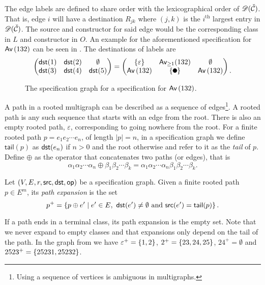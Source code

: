 The edge labels are defined to share order with the lexicographical order of $\mathscr{D}(\check{\mathcal{C}})$. That is, edge $i$ will have a destination $R_{jk}$  where $(j,k)$ is the $i^\text{th}$ largest entry in $\mathscr{D}(\check{\mathcal{C}})$. The source and constructor for said edge would be the corresponding class in $L$ and constructor in $O$. An example for the aforementioned specification for $\textsf{Av}\left(132\right)$ can be seen in . The destinations of labels are
\[
    \begin{pmatrix}
        \dst(1) & \dst(2) & \emptyset\\
        \dst(3) & \dst(4) & \dst(5)
    \end{pmatrix}
    =
    \begin{pmatrix}
    \set{\varepsilon} & \textsf{Av}_{\geq1}(132) & \emptyset \\
    \Av{132} & \set{\point{0.1}} & \Av{132}
    \end{pmatrix}
    \begin{matrix}\\.\end{matrix}
\]

\begin{figure}[ht!]
    \centering
    
    \caption{The specification graph for a specification for $\textsf{Av}\left(132\right)$.}
    \label{fig:specgraph132}
\end{figure}

A path in a rooted multigraph can be described as a sequence of edges\footnote{Using a sequence of vertices is ambiguous in multigraphs.}. A rooted path is any such sequence that starts with an edge from the root. There is also an empty rooted path, $\varepsilon$, corresponding to going nowhere from the root. For a finite rooted path $p=e_1e_2\dotsm e_n$, of length $|p|=n$, in a specification graph we define $\textsf{tail}(p)$ as $\textsf{dst}(e_n)$ if $n>0$ and the root otherwise and refer to it as the \emph{tail} of $p$. Define $\oplus$ as the operator that concatenates two paths (or edges), that is
\[
    \alpha_1\alpha_2 \dotsm \alpha_n \oplus \beta_1\beta_2 \dotsm \beta_k = \alpha_1\alpha_2 \dotsm \alpha_n\beta_1\beta_2 \dotsm \beta_k.
\]

\begin{definition}
Let $(V,E,r,\textsf{src},\textsf{dst},\textsf{op})$ be a specification graph. Given a finite rooted path $p \in E^m$, its \emph{path expansion} is the set 
\[
    p^+ = \left\{p \oplus e' \mid e' \in E, \ \textsf{dst}(e') \neq \emptyset \text{ and } \textsf{src}(e') = \textsf{tail}(p)\right\}.
\]
\end{definition}
If a path ends in a terminal class, its path expansion is the empty set. Note that we never expand to empty classes and that expansions only depend on the tail of the path. In the graph from  we have $\varepsilon^+ = \left\{1,2\right\}$, $2^+ = \left\{23,24,25\right\}$, $24^+ = \emptyset$ and $2523^+ = \left\{25231, 25232\right\}$.



